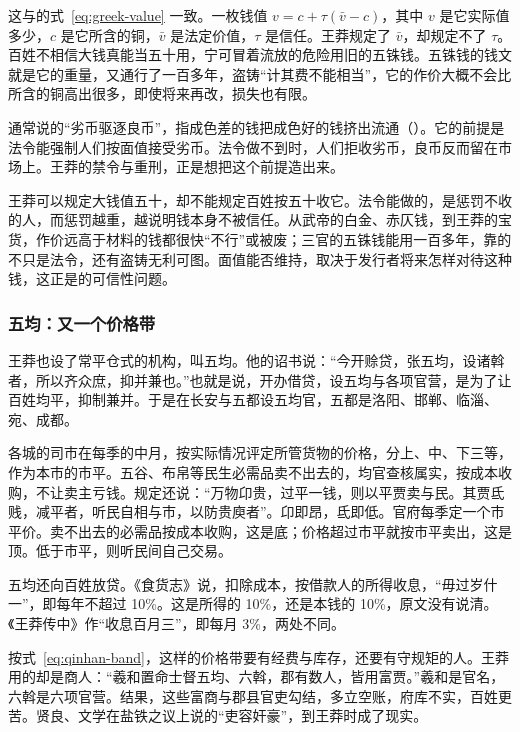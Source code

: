 这与的式~\eqref{eq:greek-value} 一致。一枚钱值 $v=c+\tau(\bar v-c)$，其中 $v$ 是它实际值多少，$c$ 是它所含的铜，$\bar v$ 是法定价值，$\tau$ 是信任。王莽规定了 $\bar v$，却规定不了 $\tau$。百姓不相信大钱真能当五十用，宁可冒着流放的危险用旧的五铢钱。五铢钱的钱文就是它的重量，又通行了一百多年，盗铸“计其费不能相当”，它的作价大概不会比所含的铜高出很多，即使将来再改，损失也有限。

通常说的“劣币驱逐良币”，指成色差的钱把成色好的钱挤出流通（）。它的前提是法令能强制人们按面值接受劣币。法令做不到时，人们拒收劣币，良币反而留在市场上。王莽的禁令与重刑，正是想把这个前提造出来。

\begin{pitfall}
王莽可以规定大钱值五十，却不能规定百姓按五十收它。法令能做的，是惩罚不收的人，而惩罚越重，越说明钱本身不被信任。从武帝的白金、赤仄钱，到王莽的宝货，作价远高于材料的钱都很快“不行”或被废；三官的五铢钱能用一百多年，靠的不只是法令，还有盗铸无利可图。面值能否维持，取决于发行者将来怎样对待这种钱，这正是的可信性问题。
\end{pitfall}

\subsubsection{五均：又一个价格带}
王莽也设了常平仓式的机构，叫五均。他的诏书说：“今开赊贷，张五均，设诸斡者，所以齐众庶，抑并兼也。”也就是说，开办借贷，设五均与各项官营，是为了让百姓均平，抑制兼并。于是在长安与五都设五均官，五都是洛阳、邯郸、临淄、宛、成都\cite{hanshu}。

各城的司市在每季的中月，按实际情况评定所管货物的价格，分上、中、下三等，作为本市的市平。五谷、布帛等民生必需品卖不出去的，均官查核属实，按成本收购，不让卖主亏钱。规定还说：“万物卬贵，过平一钱，则以平贾卖与民。其贾氐贱，减平者，听民自相与市，以防贵庾者”\cite{hanshu}。卬即昂，氐即低。官府每季定一个市平价。卖不出去的必需品按成本收购，这是底；价格超过市平就按市平卖出，这是顶。低于市平，则听民间自己交易。

五均还向百姓放贷。《食货志》说，扣除成本，按借款人的所得收息，“毋过岁什一”，即每年不超过 10\%。这是所得的 10\%，还是本钱的 10\%，原文没有说清。《王莽传中》作“收息百月三”，即每月 3\%\cite{hanshu}，两处不同。

按式~\eqref{eq:qinhan-band}，这样的价格带要有经费与库存，还要有守规矩的人。王莽用的却是商人：“羲和置命士督五均、六斡，郡有数人，皆用富贾。”羲和是官名，六斡是六项官营。结果，这些富商与郡县官吏勾结，多立空账，府库不实，百姓更苦\cite{hanshu}。贤良、文学在盐铁之议上说的“吏容奸豪”，到王莽时成了现实。

